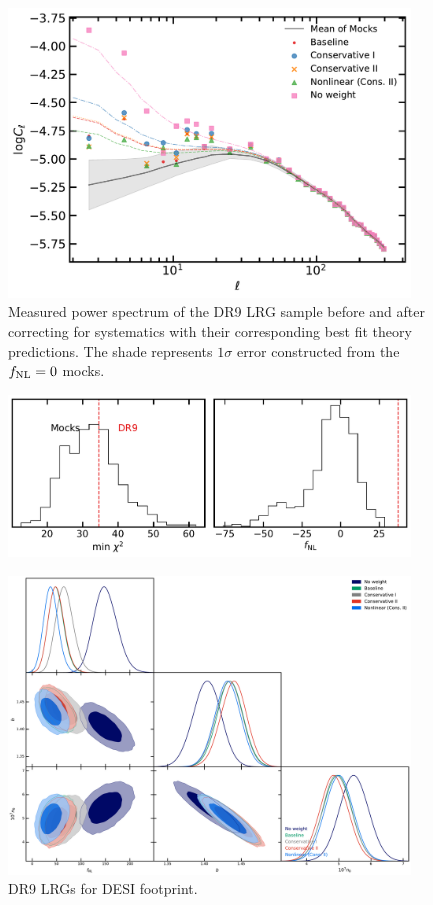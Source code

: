 \begin{figure}
    \centering
    \includegraphics[width=0.95\textwidth]{figures/model_dr9.pdf} 
    \caption{Measured power spectrum of the DR9 LRG sample before and after correcting for systematics with their corresponding best fit theory predictions. The shade represents $1\sigma$ error constructed from the $f_{\rm NL}=0$ mocks.}
    \label{fig:cl_dr9}
\end{figure}

\begin{figure}
\centering
    \includegraphics[width=0.95\textwidth]{figures/pdf_dr9vsmocks.pdf} 
    \caption{}\label{fig:dr9vsmocks}
\end{figure}

\begin{figure}
    \centering
    \includegraphics[width=0.95\textwidth]{figures/mcmc_dr9methods.pdf} 
    \caption{DR9 LRGs for DESI footprint.}\label{fig:mcmc_dr9}
\end{figure}

